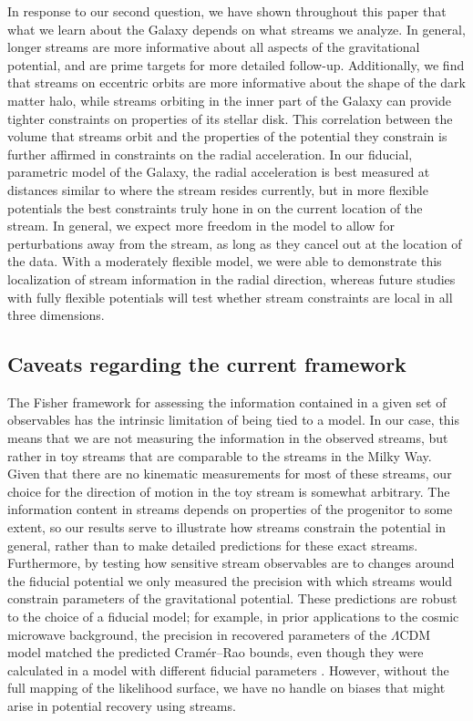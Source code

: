 \documentclass[modern]{aastex61}
\begin{document}
In response to our second question, we have shown throughout this paper that what we learn about the Galaxy depends on what streams we analyze.
In general, longer streams are more informative about all aspects of the gravitational potential, and are prime targets for more detailed follow-up.
Additionally, we find that streams on eccentric orbits are more informative about the shape of the dark matter halo, while streams orbiting in the inner part of the Galaxy can provide tighter constraints on properties of its stellar disk.
This correlation between the volume that streams orbit and the properties of the potential they constrain is further affirmed in constraints on the radial acceleration.
In our fiducial, parametric model of the Galaxy, the radial acceleration is best measured at distances similar to where the stream resides currently, but in more flexible potentials the best constraints truly hone in on the current location of the stream.
In general, we expect more freedom in the model to allow for perturbations away from the stream, as long as they cancel out at the location of the data.
With a moderately flexible model, we were able to demonstrate this localization of stream information in the radial direction, whereas future studies with fully flexible potentials will test whether stream constraints are local in all three dimensions.


\subsection{Caveats regarding the current framework}
\label{sec:dis_caveats}
The Fisher framework for assessing the information contained in a given set of observables has the intrinsic limitation of being tied to a model.
In our case, this means that we are not measuring the information in the observed streams, but rather in toy streams that are comparable to the streams in the Milky Way.
Given that there are no kinematic measurements for most of these streams, our choice for the direction of motion in the toy stream is somewhat arbitrary.
The information content in streams depends on properties of the progenitor to some extent, so our results serve to illustrate how streams constrain the potential in general, rather than to make detailed predictions for these exact streams.
Furthermore, by testing how sensitive stream observables are to changes around the fiducial potential we only measured the precision with which streams would constrain parameters of the gravitational potential.
These predictions are robust to the choice of a fiducial model; for example, in prior applications to the cosmic microwave background, the precision in recovered parameters of the $\Lambda$CDM model matched the predicted Cram\'er--Rao bounds, even though they were calculated in a model with different fiducial parameters \citep{bond1997,spergel2003}.
However, without the full mapping of the likelihood surface, we have no handle on biases that might arise in potential recovery using streams.
\end{document}

